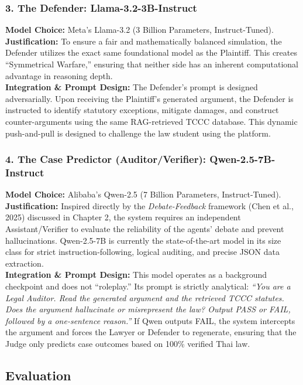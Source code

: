 \subsubsection{3. The Defender: Llama-3.2-3B-Instruct}
\noindent\textbf{Model Choice:} Meta's Llama-3.2 (3 Billion Parameters, Instruct-Tuned). \\
\textbf{Justification:} To ensure a fair and mathematically balanced simulation, the Defender utilizes the exact same foundational model as the Plaintiff. This creates ``Symmetrical Warfare,'' ensuring that neither side has an inherent computational advantage in reasoning depth. \\
\textbf{Integration \& Prompt Design:} The Defender's prompt is designed adversarially. Upon receiving the Plaintiff's generated argument, the Defender is instructed to identify statutory exceptions, mitigate damages, and construct counter-arguments using the same RAG-retrieved TCCC database. This dynamic push-and-pull is designed to challenge the law student using the platform.

\subsubsection{4. The Case Predictor (Auditor/Verifier): Qwen-2.5-7B-Instruct}
\noindent\textbf{Model Choice:} Alibaba's Qwen-2.5 (7 Billion Parameters, Instruct-Tuned). \\
\textbf{Justification:} Inspired directly by the \textit{Debate-Feedback} framework (Chen et al., 2025) discussed in Chapter 2, the system requires an independent Assistant/Verifier to evaluate the reliability of the agents' debate and prevent hallucinations. Qwen-2.5-7B is currently the state-of-the-art model in its size class for strict instruction-following, logical auditing, and precise JSON data extraction. \\
\textbf{Integration \& Prompt Design:} This model operates as a background checkpoint and does not ``roleplay.'' Its prompt is strictly analytical: \textit{``You are a Legal Auditor. Read the generated argument and the retrieved TCCC statutes. Does the argument hallucinate or misrepresent the law? Output PASS or FAIL, followed by a one-sentence reason.''} If Qwen outputs FAIL, the system intercepts the argument and forces the Lawyer or Defender to regenerate, ensuring that the Judge only predicts case outcomes based on 100\% verified Thai law.

\subsection{Evaluation}

